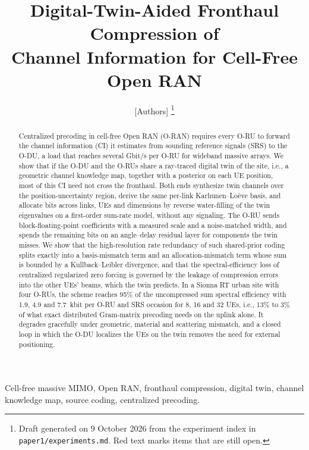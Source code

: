 \documentclass[journal]{IEEEtran}
\begin{document}
\title{Digital-Twin-Aided Fronthaul Compression of\\ Channel Information for Cell-Free Open RAN}
\author{[Authors]%
\thanks{Draft generated on 9 October 2026 from the experiment index in \texttt{paper1/experiments.md}. Red text marks items that are still open.}}

\maketitle

\begin{abstract}
Centralized precoding in cell-free Open RAN (O-RAN) requires every O-RU to forward the channel information (CI) it estimates from sounding reference signals (SRS) to the O-DU, a load that reaches several Gbit/s per O-RU for wideband massive arrays. We show that if the O-DU and the O-RUs share a ray-traced digital twin of the site, i.e., a geometric channel knowledge map, together with a posterior on each UE position, most of this CI need not cross the fronthaul. Both ends synthesize twin channels over the position-uncertainty region, derive the same per-link Karhunen--Lo\`eve basis, and allocate bits across links, UEs and dimensions by reverse water-filling of the twin eigenvalues on a first-order sum-rate model, without any signaling. The O-RU sends block-floating-point coefficients with a measured scale and a noise-matched width, and spends the remaining bits on an angle--delay residual layer for components the twin misses. We show that the high-resolution rate redundancy of such shared-prior coding splits exactly into a basis-mismatch term and an allocation-mismatch term whose sum is bounded by a Kullback--Leibler divergence, and that the spectral-efficiency loss of centralized regularized zero forcing is governed by the leakage of compression errors into the other UEs' beams, which the twin predicts. In a Sionna RT urban site with four O-RUs, the scheme reaches 95\% of the uncompressed sum spectral efficiency with 1.9, 4.9 and 7.7~kbit per O-RU and SRS occasion for 8, 16 and 32 UEs, i.e., 13\% to 3\% of what exact distributed Gram-matrix precoding needs on the uplink alone. It degrades gracefully under geometric, material and scattering mismatch, and a closed loop in which the O-DU localizes the UEs on the twin removes the need for external positioning.
\end{abstract}

\begin{IEEEkeywords}
Cell-free massive MIMO, Open RAN, fronthaul compression, digital twin, channel knowledge map, source coding, centralized precoding.
\end{IEEEkeywords}
\end{document}
